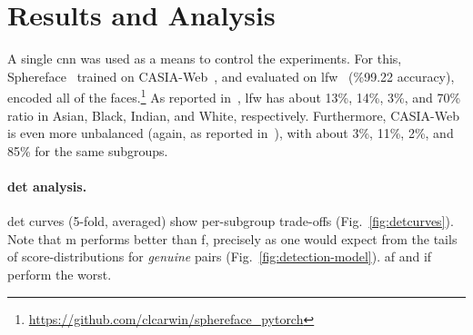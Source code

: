 
\section{Results and Analysis}
A single \gls{cnn} was used as a means to control the experiments. For this, Sphereface~\cite{liu2017sphereface} trained on CASIA-Web~\cite{yi2014learning}, and evaluated on \gls{lfw}~\cite{LFWTech} (\%99.22 accuracy), encoded all of the faces.\footnote{\href{$https://github.com/clcarwin/sphereface\_pytorch$}{https://github.com/clcarwin/sphereface\_pytorch}} As reported in~\cite{wang2019racial}, \gls{lfw} has about 13\%, 14\%, 3\%, and 70\% ratio in Asian, Black, Indian, and White, respectively. Furthermore, CASIA-Web is even more unbalanced (again, as reported in~\cite{wang2018racial}), with about  3\%, 11\%, 2\%, and 85\% for the same subgroups.
\vspace{-5mm}
\noindent\paragraph{\gls{det} analysis.}
\gls{det} curves (5-fold, averaged) show per-subgroup trade-offs (Fig.~\ref{fig:detcurves}). Note that \gls{m} performs better than \gls{f}, precisely as one would expect from the tails of score-distributions for \emph{genuine} pairs (Fig.~\ref{fig:detection-model}). \Gls{af} and \gls{if} perform the worst.


